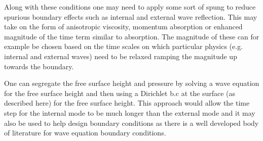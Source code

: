 Along with these conditions one may need to apply some sort
of spung to reduce spurious boundary effects such as
internal and external wave reflection. This may take
on the form of anisotropic viscosity, momentum absorption or enhanced magnitude
of the time term similar to absorption. The magnitude of these
can for example be chosen based on the time scales on which
particular physics (e.g. internal and external waves)
need to be relaxed ramping the magnitude up
towards the boundary.

One can segregate the free surface height and pressure by solving a wave equation for the free surface height and then
using a Dirichlet b.c at the surface (as described here) for the free surface height.
This approach would allow the time step for the internal mode to be much longer
than the external mode and it may also be used to help design boundary conditions
as there is a well developed body of literature for wave equation boundary
conditions.

